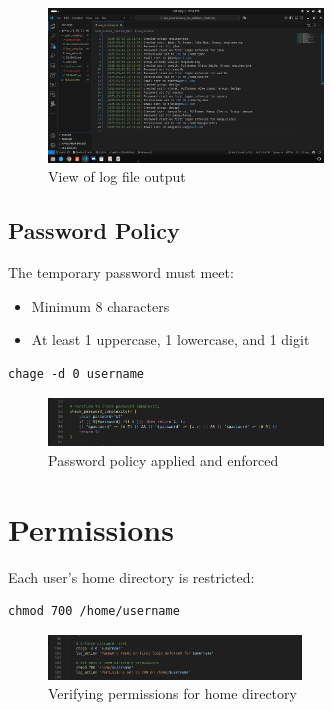 \documentclass[a4paper,11pt]{article}
\begin{document}
\begin{figure}[h!]
  \centering
  \includegraphics[width=0.65\textwidth]{screenshots/log_output.png}
  \caption{View of log file output}
\end{figure}

\subsection*{Password Policy}
The temporary password must meet:
\begin{itemize}
  \item Minimum 8 characters
  \item At least 1 uppercase, 1 lowercase, and 1 digit
\end{itemize}

\begin{lstlisting}
chage -d 0 username
\end{lstlisting}

\begin{figure}[h!]
  \centering
  \includegraphics[width=0.65\textwidth]{screenshots/password_policy.png}
  \caption{Password policy applied and enforced}
\end{figure}

\section*{Permissions}
Each user's home directory is restricted:

\begin{lstlisting}
chmod 700 /home/username
\end{lstlisting}

\begin{figure}[h!]
  \centering
  \includegraphics[width=0.6\textwidth]{screenshots/home_dir_permissions.png}
  \caption{Verifying permissions for home directory}
\end{figure}
\end{document}
